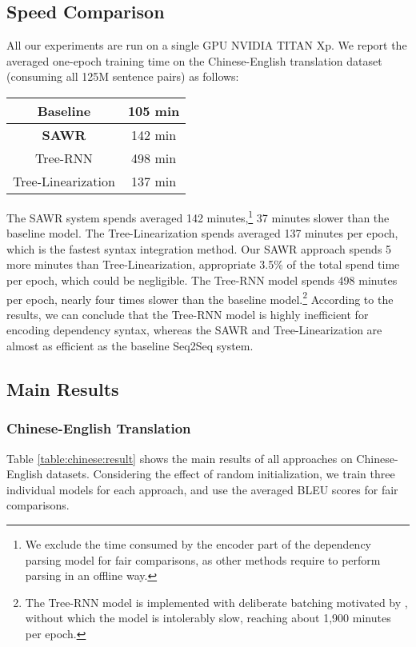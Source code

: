 \documentclass[11pt,a4paper]{article}
\begin{document}
\begin{CJK}{UTF8}{gbsn}
\subsection{Speed Comparison}
All our experiments are run on a single GPU NVIDIA TITAN Xp.
We report the averaged one-epoch training time on the Chinese-English translation dataset (consuming all 125M sentence pairs)
as follows:

\begin{center}
\begin{tabular}{ c  c   }
\hline
 Baseline & 105 min \\ \hline
 \textbf{SAWR} & 142 min \\ \hline \hline
 Tree-RNN & 498 min \\
 Tree-Linearization  &  137 min \\
\hline
\end{tabular}
\end{center}
The SAWR system spends averaged 142 minutes,\footnote{We exclude the time consumed by the encoder part of the dependency parsing model for fair comparisons, as other methods require to perform parsing in an offline way.}
37 minutes slower than the baseline model.
The Tree-Linearization spends averaged 137 minutes per epoch,
which is the fastest syntax integration method.
Our SAWR approach spends 5 more minutes than Tree-Linearization,
appropriate 3.5\% of the total spend time per epoch,
which could be negligible.
The Tree-RNN model spends 498 minutes per epoch,
nearly four times slower than the baseline model.\footnote{The Tree-RNN model is implemented with deliberate batching motivated by , without which the model is intolerably slow, reaching about 1,900 minutes per epoch.}
According to  the results,
we can conclude that the Tree-RNN model is highly inefficient for encoding dependency syntax,
whereas the SAWR and Tree-Linearization are almost as efficient as the baseline Seq2Seq system.



\subsection{Main Results}
\subsubsection{Chinese-English Translation}
Table \ref{table:chinese:result} shows the main results of all approaches on Chinese-English datasets.
Considering the effect of random initialization, we train three individual models for each approach,
and use the averaged BLEU scores for fair comparisons.


\end{CJK}
\end{document}
